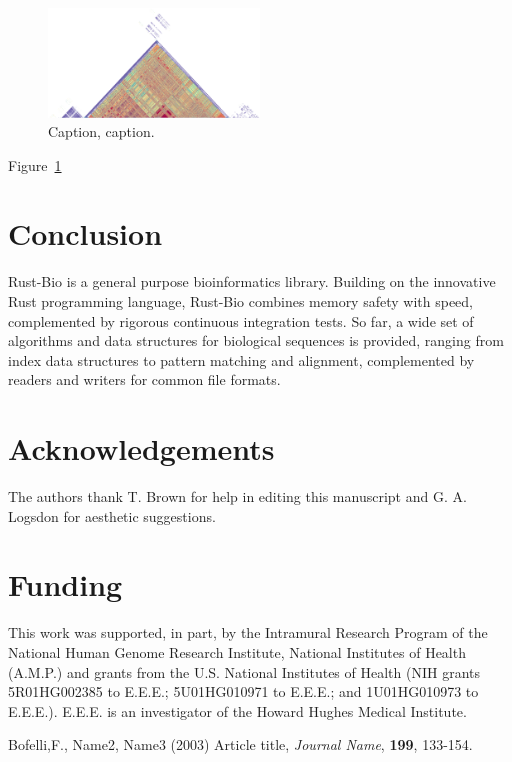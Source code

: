 \documentclass{bioinfo}
\begin{document}
%
%

\begin{figure}[!tpb]%
\centerline{\includegraphics[width=0.5\textwidth,keepaspectratio]{../images/chr8.png}}
\caption{Caption, caption.}\label{fig:01}
\end{figure}
Figure~\ref{fig:01} 


\section{Conclusion}
Rust-Bio is a general purpose bioinformatics library. Building on the innovative Rust programming language, Rust-Bio combines memory safety with speed, complemented by rigorous continuous integration tests. So far, a wide set of algorithms and data structures for biological sequences is provided, ranging from index data structures to pattern matching and alignment, complemented by readers and writers for common file formats.

\section*{Acknowledgements}
The authors thank T. Brown for help in editing this manuscript 
and G. A. Logsdon for aesthetic suggestions.

\section*{Funding}
This work was supported, in part,
by the Intramural Research Program of the National Human Genome Research Institute,
National Institutes of Health (A.M.P.) and grants from the U.S. National Institutes of
Health (NIH grants 5R01HG002385 to E.E.E.; 5U01HG010971 to E.E.E.; and 1U01HG010973 to
E.E.E.). E.E.E. is an investigator of the Howard Hughes Medical Institute.

%
%
%
%
%
%
%
%
%


\begin{thebibliography}{}

Bofelli,F., Name2, Name3 (2003) Article title, {\it Journal Name}, {\bf 199}, 133-154.


\end{thebibliography}
\end{document}
